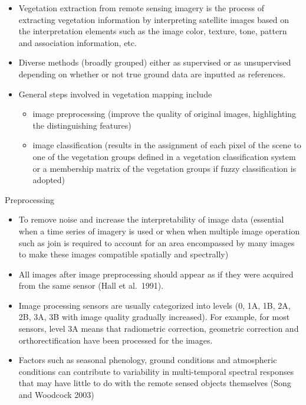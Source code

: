 \documentclass[11pt,dvipsnames,ignorenonframetext,aspectratio=169]{beamer}
\providecommand{\tightlist}{%
  \setlength{\itemsep}{0pt}\setlength{\parskip}{0pt}}
\begin{document}
\begin{frame}{}
\protect\hypertarget{section-6}{}
\begin{itemize}
\tightlist
\item
  Vegetation extraction from remote sensing imagery is the process of
  extracting vegetation information by interpreting satellite images
  based on the interpretation elements such as the image color, texture,
  tone, pattern and association information, etc.
\item
  Diverse methods (broadly grouped) either as supervised or as
  unsupervised depending on whether or not true ground data are inputted
  as references.
\item
  General steps involved in vegetation mapping include

  \begin{itemize}
  \tightlist
  \item
    image preprocessing (improve the quality of original images,
    highlighting the distinguishing features)
  \item
    image classification (results in the assignment of each pixel of the
    scene to one of the vegetation groups defined in a vegetation
    classification system or a membership matrix of the vegetation
    groups if fuzzy classification is adopted)
  \end{itemize}
\end{itemize}
\end{frame}

\begin{frame}{Preprocessing}
\protect\hypertarget{preprocessing}{}
\begin{itemize}
\tightlist
\item
  To remove noise and increase the interpretability of image data
  (essential when a time series of imagery is used or when when multiple
  image operation such as join is required to account for an area
  encompassed by many images to make these images compatible spatially
  and spectrally)
\item
  All images after image preprocessing should appear as if they were
  acquired from the same sensor (Hall et al.~1991).
\item
  Image processing sensors are usually categorized into levels (0, 1A,
  1B, 2A, 2B, 3A, 3B with image quality gradually increased). For
  example, for most sensors, level 3A means that radiometric correction,
  geometric correction and orthorectification have been processed for
  the images.
\item
  Factors such as seasonal phenology, ground conditions and atmospheric
  conditions can contribute to variability in multi-temporal spectral
  responses that may have little to do with the remote sensed objects
  themselves (Song and Woodcock 2003)
\end{itemize}
\end{frame}
\end{document}
